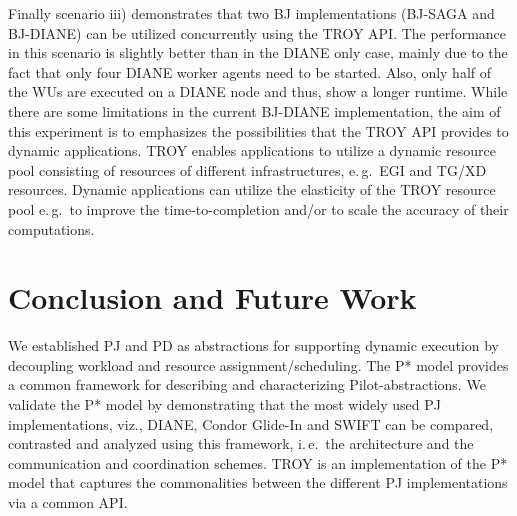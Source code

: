 \documentclass[conference,final]{IEEEtran}
\newcommand{\upp}{\vspace*{-0.5em}}
\begin{document}

Finally scenario iii) demonstrates that two BJ implementations
(BJ-SAGA and BJ-DIANE) can be utilized concurrently using the TROY
API. The performance in this scenario is slightly better than in the
DIANE only case, mainly due to the fact that only four DIANE worker
agents need to be started. Also, only half of the WUs are executed on
a DIANE node and thus, show a longer runtime. While there are some
limitations in the current BJ-DIANE implementation, the aim of this
experiment is to emphasizes the possibilities that the TROY API
provides to dynamic applications. TROY enables applications to utilize
a dynamic resource pool consisting of resources of different
infrastructures, e.\,g.\ EGI and TG/XD resources. Dynamic applications
can utilize the elasticity of the TROY resource pool e.\,g.\ to
improve the time-to-completion and/or to scale the accuracy of their
computations.



\upp


\section{Conclusion and Future Work\upp\upp}


We established PJ and PD as abstractions for supporting dynamic
execution by decoupling workload and resource
assignment/scheduling. The P* model provides a common framework for
describing and characterizing Pilot-abstractions.  We validate the P*
model by demonstrating that the most widely used PJ implementations,
viz., DIANE, Condor Glide-In and SWIFT can be compared, contrasted and
analyzed using this framework, i.\,e.\ the architecture and the
communication and coordination schemes.  TROY is an implementation of
the P* model that captures the commonalities between the different PJ
implementations via a common API.
\end{document}
